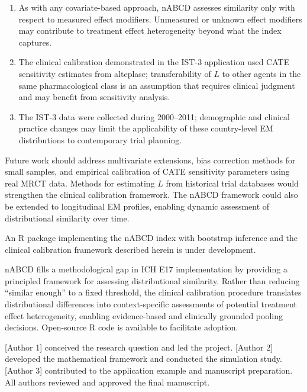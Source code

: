 \documentclass[AMA,Times1COL]{WileyNJDv5}
\begin{document}
\begin{enumerate}[1.]
\item As with any covariate-based approach, nABCD assesses similarity only with respect to measured effect modifiers. Unmeasured or unknown effect modifiers may contribute to treatment effect heterogeneity beyond what the index captures.
\item The clinical calibration demonstrated in the IST-3 application used CATE sensitivity estimates from alteplase; transferability of $L$ to other agents in the same pharmacological class is an assumption that requires clinical judgment and may benefit from sensitivity analysis.
\item The IST-3 data were collected during 2000--2011; demographic and clinical practice changes may limit the applicability of these country-level EM distributions to contemporary trial planning.
\end{enumerate}

Future work should address multivariate extensions, bias correction methods for small samples, and empirical calibration of CATE sensitivity parameters using real MRCT data. Methods for estimating $L$ from historical trial databases would strengthen the clinical calibration framework. The nABCD framework could also be extended to longitudinal EM profiles, enabling dynamic assessment of distributional similarity over time.

An R package implementing the nABCD index with bootstrap inference and the clinical calibration framework described herein is under development.

nABCD fills a methodological gap in ICH E17 implementation by providing a principled framework for assessing distributional similarity. Rather than reducing ``similar enough'' to a fixed threshold, the clinical calibration procedure translates distributional differences into context-specific assessments of potential treatment effect heterogeneity, enabling evidence-based and clinically grounded pooling decisions. Open-source R code is available to facilitate adoption.



[Author 1] conceived the research question and led the project. [Author 2] developed the mathematical framework and conducted the simulation study. [Author 3] contributed to the application example and manuscript preparation. All authors reviewed and approved the final manuscript.
\end{document}
